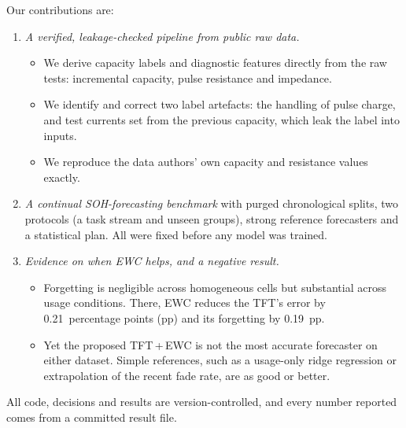 Our contributions are:
\begin{enumerate}
  \item \emph{A verified, leakage-checked pipeline from public raw data.}
  \begin{itemize}
    \item We derive capacity labels and diagnostic features directly from the raw tests: incremental capacity, pulse resistance and impedance.
    \item We identify and correct two label artefacts: the handling of pulse charge, and test currents set from the previous capacity, which leak the label into inputs.
    \item We reproduce the data authors' own capacity and resistance values exactly.
  \end{itemize}
  \item \emph{A continual SOH-forecasting benchmark} with purged chronological splits, two protocols (a task stream and unseen groups), strong reference forecasters and a statistical plan. All were fixed before any model was trained.
  \item \emph{Evidence on when EWC helps, and a negative result.}
  \begin{itemize}
    \item Forgetting is negligible across homogeneous cells but substantial across usage conditions. There, EWC reduces the TFT's error by 0.21~percentage points (pp) and its forgetting by 0.19~pp.
    \item Yet the proposed TFT\,+\,EWC is not the most accurate forecaster on either dataset. Simple references, such as a usage-only ridge regression or extrapolation of the recent fade rate, are as good or better.
  \end{itemize}
\end{enumerate}
All code, decisions and results are version-controlled, and every number reported comes from a committed result file.
